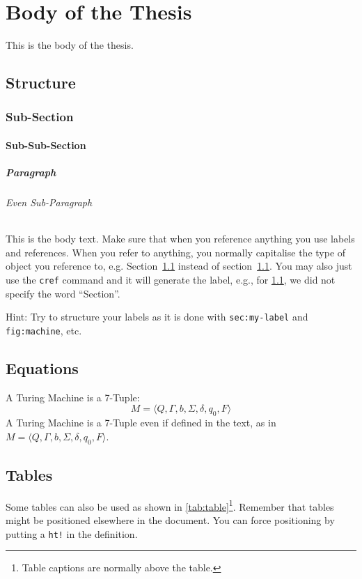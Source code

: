 \chapter{Body of the Thesis}

This is the body of the thesis.

\section{Structure}
\label{sec:my-label}

\subsection{Sub-Section}

\subsubsection{Sub-Sub-Section}

\paragraph{Paragraph}

\subparagraph{Even Sub-Paragraph}

This is the body text. Make sure that when you reference anything you use labels and references. When you refer to anything, you normally capitalise the type of object you reference to, e.g. Section~\ref{sec:my-label} instead of section~\ref{sec:my-label}. You may also just use the \texttt{cref} command and it will generate the label, e.g., for \cref{sec:my-label}, we did not specify the word ``Section''.

Hint: Try to structure your labels as it is done with \texttt{sec:my-label} and \texttt{fig:machine}, etc.



\section{Equations}
A Turing Machine is a 7-Tuple:
\begin{equation}
    M = \langle Q, \Gamma, b, \Sigma, \delta, q_0, F \rangle
\end{equation}
A Turing Machine is a 7-Tuple even if defined in the text, as in $M = \langle Q, \Gamma, b, \Sigma, \delta, q_0, F \rangle$.




\section{Tables}
Some tables can also be used as shown in \cref{tab:table}\footnote{Table captions are normally above the table.}. Remember that tables might be positioned elsewhere in the document. You can force positioning by putting a \texttt{ht!} in the definition.

